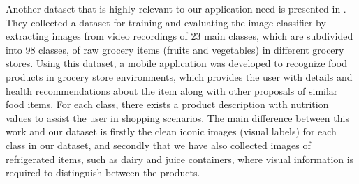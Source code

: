 Another dataset that is highly relevant to our application need is presented in  . They collected a dataset for training and evaluating the image classifier by extracting images from video recordings of 23 main classes, which are subdivided into 98 classes, of raw grocery items (fruits and vegetables) in different grocery stores. Using this dataset, a mobile application was developed to recognize food products in grocery store environments, which provides the user with details and health recommendations about the item along with other proposals of similar food items. For each class, there exists a product description with nutrition values to assist the user in shopping scenarios. The main difference between this work and our dataset is firstly the clean iconic images (visual labels) for each class in our dataset, and secondly that we have also collected images of refrigerated items, such as dairy and juice containers, where visual information is required to distinguish between the products.   
